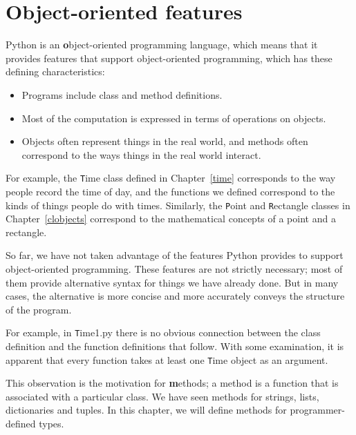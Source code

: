 \documentclass[
DIV=11,
fontsize=13,
twoside,
headinclude=false,
titlepage=firstiscover,
abstract=true,
headsepline=true,
footsepline=true,
chapterprefix=true, %
headings=big,
bibliography=totoc,%
captions=tableheading
]{scrbook}
\theoremstyle{definition}
\begin{document}
\section{Object-oriented features}

Python is an {\textbf object-oriented programming language}, which means
that it provides features that support object-oriented
programming, which has these defining characteristics:

\begin{itemize}

\item Programs include class and method definitions.

\item Most of the computation is expressed in terms of operations on
  objects.

\item Objects often represent things
in the real world, and methods often
correspond to the ways things in the real world interact.

\end{itemize}

For example, the {\texttt Time} class defined in Chapter~\ref{time}
corresponds to the way people record the time of day, and the
functions we defined correspond to the kinds of things people do with
times.  Similarly, the {\texttt Point} and {\texttt Rectangle} classes
in Chapter~\ref{clobjects}
correspond to the mathematical concepts of a point and a rectangle.

So far, we have not taken advantage of the features Python provides to
support object-oriented programming.  These
features are not strictly necessary; most of them provide
alternative syntax for things we have already done.  But in many cases,
the alternative is more concise and more accurately conveys the
structure of the program.

For example, in {\texttt Time1.py} there is no obvious
connection between the class definition and the function definitions
that follow.  With some examination, it is apparent that every function
takes at least one {\texttt Time} object as an argument.

This observation is the motivation for {\textbf methods}; a method is
a function that is associated with a particular class.
We have seen methods for strings, lists, dictionaries and tuples.
In this chapter, we will define methods for programmer-defined types.
\end{document}
